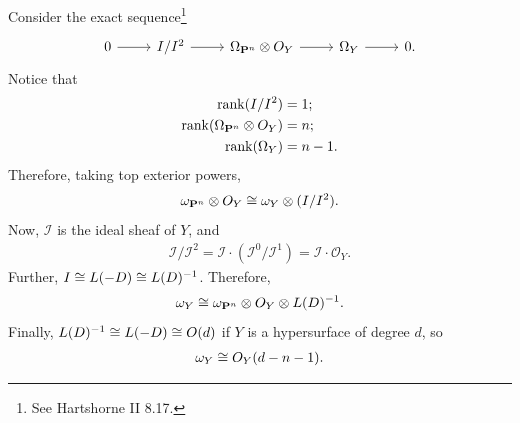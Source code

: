 \documentclass [11 pt, oneside] {article}
\begin{document}
Consider the exact sequence\footnote{See Hartshorne II 8.17.}
\[
\begin{tikzcd}
	0\ar[r] & \mathscr{I}/\mathscr{I}^2 \ar[r] & \Omega_{\mathbf{P}^n}\tensor \mathscr{O}_Y \ar[r] & \Omega_Y\ar[r] &0.
\end{tikzcd}
\]
Notice that
\begin{align*}
	\operatorname{rank} (\relax{I}/\relax{I}^2) &= 1;\\
	\operatorname{rank} (\Omega_{\mathbf{P}^n}\otimes \relax{O}_Y) &= n;\\
	\operatorname{rank} (\Omega_Y) &= n-1.
\end{align*}
Therefore, taking top exterior powers,
\begin{align*}
	\omega_{\mathbf{P}^n} \otimes \relax{O}_Y \cong \omega_Y \otimes (\relax{I}/\relax{I}^2).
\end{align*}
Now, $\mathscr{I}$ is the ideal sheaf of $Y$, and 
\begin{align*}
	\mathscr{I}/\mathscr{I}^2 = \mathscr{I}\cdot (\mathscr{I}^0/\mathscr{I}^1) = \mathscr{I}\cdot  \mathscr{O}_Y.
\end{align*}
Further, $\relax{I}\cong \relax{L}(-D)\cong  \relax{L}(D) ^{-1}$. Therefore,
\begin{align*}
	\omega_Y \cong \omega_{\mathbf{P}^n} \otimes \relax{O}_Y \otimes \relax{L}(D) ^{-1}.
\end{align*}
Finally, $\relax{L}(D) ^{-1} \cong \relax{L}(-D)\cong  \relax{O}(d)$ if $Y$ is a hypersurface of degree $d$, so
\begin{align*}
	\omega_Y \cong \relax{O}_Y(d-n-1).
\end{align*}
\end{document}

